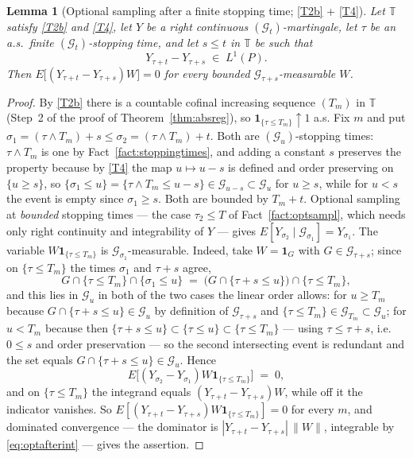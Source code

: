 \documentclass[11pt,a4paper]{article}
\theoremstyle{plain}
\newtheorem{lemma}[theorem]{Lemma}
\theoremstyle{definition}
\theoremstyle{remark}
\newcommand{\T}{\mathbb{T}}                     %
\newcommand{\Gilt}{\mathcal{G}}
\newcommand{\one}{\mathbf{1}}
\begin{document}
\begin{lemma}[Optional sampling after a finite stopping time; \eqref{T2b} + \eqref{T4}]
  \label{lem:optsamplafter}
  Let $\T$ satisfy \eqref{T2b} and \eqref{T4}, let $Y$ be a right continuous
  $(\Gilt_t)$-martingale, let $\tau$ be an a.s.\ finite $(\Gilt_t)$-stopping
  time, and let $s \leq t$ in $\T$ be such that
  \begin{equation}
    \label{eq:optafterint}
    Y_{\tau+t} - Y_{\tau+s} \;\in\; L^1(P) .
  \end{equation}
  Then $E\bigl[ (Y_{\tau+t} - Y_{\tau+s}) W \bigr] = 0$ for every bounded
  $\Gilt_{\tau+s}$-measurable $W$.
\end{lemma}

\begin{proof}
  By \eqref{T2b} there is a countable cofinal increasing sequence $(T_m)$ in $\T$
  (Step~2 of the proof of Theorem~\ref{thm:absreg}), so
  $\one_{\{\tau \leq T_m\}} \uparrow 1$ a.s.  Fix $m$ and put
  $\sigma_1 = (\tau \wedge T_m) + s \leq \sigma_2 = (\tau \wedge T_m) + t$.  Both
  are $(\Gilt_u)$-stopping times: $\tau \wedge T_m$ is one by
  Fact~\ref{fact:stoppingtimes}, and adding a constant $s$ preserves the property
  because by \eqref{T4} the map $u \mapsto u-s$ is defined and order preserving on
  $\{u \geq s\}$, so $\{\sigma_1 \leq u\} = \{\tau \wedge T_m \leq u-s\} \in
  \Gilt_{u-s} \subset \Gilt_u$ for $u \geq s$, while for $u < s$ the event is
  empty since $\sigma_1 \geq s$.  Both are bounded by $T_m + t$.  Optional sampling at \emph{bounded} stopping times --- the case
  $\tau_2 \leq T$ of Fact~\ref{fact:optsampl}, which needs only right continuity
  and integrability of $Y$ --- gives
  $E[Y_{\sigma_2} \mid \Gilt_{\sigma_1}] = Y_{\sigma_1}$.  The variable
  $W \one_{\{\tau \leq T_m\}}$ is $\Gilt_{\sigma_1}$-measurable.  Indeed, take
  $W = \one_G$ with $G \in \Gilt_{\tau+s}$; since on $\{\tau \leq T_m\}$ the
  times $\sigma_1$ and $\tau+s$ agree,
  \[
    G \cap \{\tau \leq T_m\} \cap \{\sigma_1 \leq u\}
      \;=\; \bigl( G \cap \{\tau + s \leq u\} \bigr) \cap \{\tau \leq T_m\} ,
  \]
  and this lies in $\Gilt_u$ in both of the two cases the linear order allows:
  for $u \geq T_m$ because $G \cap \{\tau+s \leq u\} \in \Gilt_u$ by definition
  of $\Gilt_{\tau+s}$ and $\{\tau \leq T_m\} \in \Gilt_{T_m} \subset \Gilt_u$;
  for $u < T_m$ because then $\{\tau + s \leq u\} \subset \{\tau \leq u\}
  \subset \{\tau \leq T_m\}$ --- using $\tau \leq \tau + s$, i.e.\ $0 \leq s$ and
  order preservation --- so the second intersecting event is redundant and the
  set equals $G \cap \{\tau+s \leq u\} \in \Gilt_u$.  Hence
  \[
    E\bigl[ (Y_{\sigma_2} - Y_{\sigma_1}) W \one_{\{\tau \leq T_m\}} \bigr]
      \;=\; 0 ,
  \]
  and on $\{\tau \leq T_m\}$ the integrand equals
  $(Y_{\tau+t} - Y_{\tau+s})W$, while off it the indicator vanishes.  So
  $E[(Y_{\tau+t} - Y_{\tau+s}) W \one_{\{\tau \leq T_m\}}] = 0$ for every $m$,
  and dominated convergence --- the dominator is
  $|Y_{\tau+t} - Y_{\tau+s}|\,\lVert W \rVert$, integrable by
  \eqref{eq:optafterint} --- gives the assertion.
\end{proof}
\end{document}
